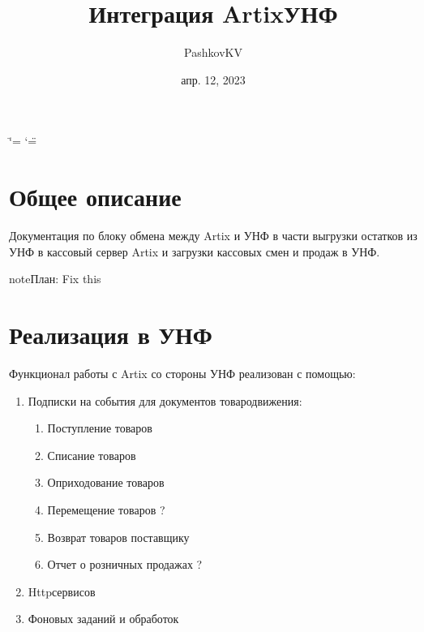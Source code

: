 \documentclass[letterpaper,10pt,russian]{sphinxmanual}
\title{Интеграция Artix\sphinxhyphen{}УНФ}
\date{апр. 12, 2023}
\author{PashkovKV}
\begin{document}
\ifdefined\shorthandoff
  \ifnum\catcode`\=\string=\active\shorthandoff{=}\fi
  \ifnum\catcode`\"=\active{}\fi
\fi

\pagestyle{empty}
\sphinxmaketitle
\pagestyle{plain}
\sphinxtableofcontents
\pagestyle{normal}
\label{\detokenize{index::doc}}


\sphinxstepscope


\chapter{Общее описание}
\label{\detokenize{description:id1}}\label{\detokenize{description::doc}}
\sphinxAtStartPar
Документация по блоку обмена между Artix и УНФ в части выгрузки остатков из УНФ в кассовый сервер Artix и загрузки кассовых смен и продаж в УНФ.

\begin{sphinxadmonition}{note}{\label{\detokenize{description:id2}}План:}
\sphinxAtStartPar
Fix this
\end{sphinxadmonition}

\sphinxstepscope


\chapter{Реализация в УНФ}
\label{\detokenize{unf:id1}}\label{\detokenize{unf::doc}}
\sphinxAtStartPar
Функционал работы с Artix со стороны УНФ реализован с помощью:
\begin{enumerate}
%
\item {} 
\sphinxAtStartPar
Подписки на события для документов товародвижения:
\begin{enumerate}
%
\item {} 
\sphinxAtStartPar
Поступление товаров

\item {} 
\sphinxAtStartPar
Списание товаров

\item {} 
\sphinxAtStartPar
Оприходование товаров

\item {} 
\sphinxAtStartPar
Перемещение товаров ?

\item {} 
\sphinxAtStartPar
Возврат товаров поставщику

\item {} 
\sphinxAtStartPar
Отчет о розничных продажах ?

\end{enumerate}

\item {} 
\sphinxAtStartPar
Http\sphinxhyphen{}сервисов

\item {} 
\sphinxAtStartPar
Фоновых заданий и обработок

\end{enumerate}
\end{document}
